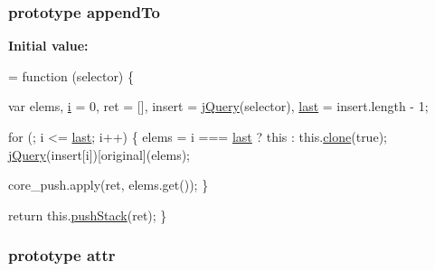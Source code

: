 \subsubsection[{\texorpdfstring{append\+To}{appendTo}}]{ {\bf prototype} append\+To}\hypertarget{jquery-2_82_81-vsdoc_8js_a74dc247b9c1e66b8cd2aad9037eeaca5}{}\label{jquery-2_82_81-vsdoc_8js_a74dc247b9c1e66b8cd2aad9037eeaca5}
{\bfseries Initial value\+:}
\begin{DoxyCode}
= \textcolor{keyword}{function} (selector) \{
        

        var elems,
            \hyperlink{geolocation-marker_8js_a0325b7ce0988782a8032e720ef3aa411}{i} = 0,
            ret = [],
            insert = \hyperlink{jquery-2_82_81-vsdoc_8js_add5237586d970a38a81f990e8eb28c6c}{jQuery}(selector),
            \hyperlink{jquery-2_82_81-vsdoc_8js_a5a9684d230de11a6ec3029bcce128977}{last} = insert.length - 1;

        \textcolor{keywordflow}{for} (; i <= \hyperlink{jquery-2_82_81-vsdoc_8js_a5a9684d230de11a6ec3029bcce128977}{last}; i++) \{
            elems = i === \hyperlink{jquery-2_82_81-vsdoc_8js_a5a9684d230de11a6ec3029bcce128977}{last} ? \textcolor{keyword}{this} : this.\hyperlink{jquery-2_82_81-vsdoc_8js_a7d74ce76585989b4b6e2d506577e13ad}{clone}(\textcolor{keyword}{true});
            \hyperlink{jquery-2_82_81-vsdoc_8js_add5237586d970a38a81f990e8eb28c6c}{jQuery}(insert[i])[original](elems);

            
            core\_push.apply(ret, elems.get());
        \}

        \textcolor{keywordflow}{return} this.\hyperlink{jquery-2_82_81-vsdoc_8js_afc3a7db1ef2b526338c06c07cecccd44}{pushStack}(ret);
    \}
\end{DoxyCode}
\subsubsection[{\texorpdfstring{attr}{attr}}]{ {\bf prototype} attr}\hypertarget{jquery-2_82_81-vsdoc_8js_aa76c97588b348e5c1975810431456d90}{}\label{jquery-2_82_81-vsdoc_8js_aa76c97588b348e5c1975810431456d90}
